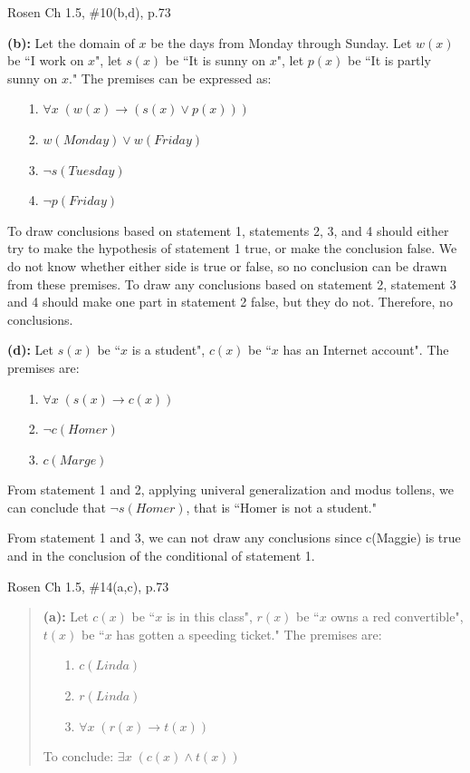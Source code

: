 \documentclass[12pt]{exam}
\begin{document}
\begin{questions}
\question[8] Rosen Ch 1.5, \#10(b,d), p.73
    \begin{solution}
    \textbf{(b):} Let the domain of $x$ be the days from Monday through Sunday.  Let $w(x)$ be ``I work on $x$", let $s(x)$ be ``It is sunny on $x$", let $p(x)$ be ``It is partly sunny on $x$."  The premises can be expressed as:
    \begin{itemize}
        \item[1.] $\forall x\; (w(x) \rightarrow (s(x) \vee p(x)))$
        \item[2.] $w(Monday) \vee w(Friday)$
        \item[3.] $\neg s(Tuesday)$
        \item[4.] $\neg p(Friday)$
    \end{itemize}
    \smallskip
    To draw conclusions based on statement 1, statements 2, 3, and 4 should either try to make the hypothesis of statement 1 true, or make the conclusion false.  We do not know whether either side is true or false, so no conclusion can be drawn from these premises.  To draw any conclusions based on statement 2, statement 3 and 4 should make one part in statement 2 false, but they do not.  Therefore, no conclusions.

    \medskip
    \textbf{(d):} Let $s(x)$ be ``$x$ is a student", $c(x)$ be ``$x$ has an Internet account".  The premises are:
    \begin{itemize}
        \item[1.] $\forall x\; (s(x) \rightarrow c(x))$
        \item[2.] $\neg c(Homer)$
        \item[3.] $c(Marge)$
    \end{itemize}
    \smallskip
    From statement 1 and 2, applying univeral generalization and modus tollens, we can conclude that $\neg s(Homer)$, that is ``Homer is not a student."

    From statement 1 and 3, we can not draw any conclusions since c(Maggie) is true and in the conclusion of the conditional of statement 1.
    \end{solution}


\question[8] Rosen Ch 1.5, \#14(a,c), p.73
\begin{solution}
\begin{quote}
    \textbf{(a):} Let $c(x)$ be ``$x$ is in this class", $r(x)$ be ``$x$ owns a red convertible", $t(x)$ be ``$x$ has gotten a speeding ticket."  The premises are:
    \begin{itemize}
        \item[1.] $c(Linda)$
        \item[2.] $r(Linda)$
        \item[3.] $\forall x\; (r(x) \rightarrow t(x))$
    \end{itemize}
    To conclude: $\exists x\; (c(x) \wedge t(x))$


\end{quote}
\end{solution}
\end{questions}
\end{document}
